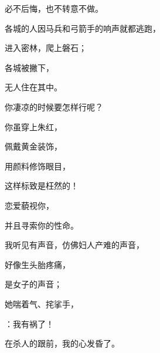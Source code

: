 {\par }{\Q 必不后悔，也不转意不做。
\par }{\Q {}各城的人因马兵和弓箭手的响声就都逃跑，
\par }{\Q 进入密林，爬上磐石；
\par }{\Q 各城被撇下，
\par }{\Q 无人住在其中。
\par }{\Q {}你凄凉的时候要怎样行呢？
\par }{\Q 你虽穿上朱红{}，
\par }{\Q 佩戴黄金装饰，
\par }{\Q 用颜料修饰眼目，
\par }{\Q 这样标致是枉然的！
\par }{\Q 恋爱{}藐视你，
\par }{\Q 并且寻索你的性命。
\par }{\Q {}我听见有声音，仿佛妇人产难的声音，
\par }{\Q 好像生头胎疼痛{}，
\par }{\Q 是{}女子的声音；
\par }{\Q 她喘着气、挓挲手，
\par }{：我有祸了！
\par }{\Q 在杀人的跟前，我的心发昏了。

}
